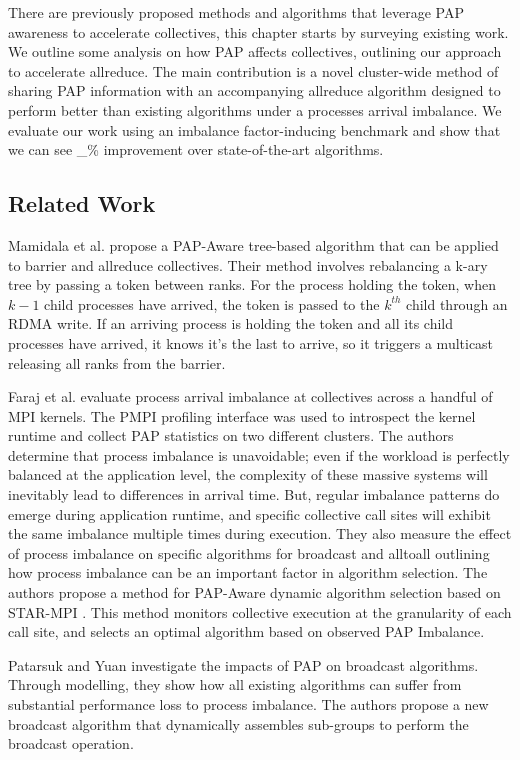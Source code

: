 There are previously proposed methods and algorithms that leverage PAP awareness to accelerate collectives, this chapter starts by surveying existing work.
We outline some analysis on how PAP affects collectives, outlining our approach to accelerate allreduce.
The main contribution is a novel cluster-wide method of sharing PAP information with an accompanying allreduce algorithm designed to perform better than existing algorithms under a processes arrival imbalance.
We evaluate our work using an imbalance factor-inducing benchmark and show that we can see \_\% improvement over state-of-the-art algorithms.  


\subsection{Related Work}
Mamidala et al. \cite{Mamidala2004BarrierAllreduceIBAdaptive} propose a PAP-Aware tree-based algorithm that can be applied to barrier and allreduce collectives.
Their method involves rebalancing a k-ary tree by passing a token between ranks.
For the process holding the token, when $k-1$ child processes have arrived, the token is passed to the $k^{th}$ child through an RDMA write.
If an arriving process is holding the token and all its child processes have arrived, it knows it's the last to arrive, so it triggers a multicast releasing all ranks from the barrier. 

Faraj et al. \cite{Faraj2008StudyProcArrivalMPIColl} evaluate process arrival imbalance at collectives across a handful of MPI kernels.
The PMPI profiling interface was used to introspect the kernel runtime and collect PAP statistics on two different clusters.
The authors determine that process imbalance is unavoidable; even if the workload is perfectly balanced at the application level, the complexity of these massive systems will inevitably lead to differences in arrival time. 
But, regular imbalance patterns do emerge during application runtime, and specific collective call sites will exhibit the same imbalance multiple times during execution.
They also measure the effect of process imbalance on specific algorithms for broadcast and alltoall outlining how process imbalance can be an important factor in algorithm selection.
The authors propose a method for PAP-Aware dynamic algorithm selection based on STAR-MPI \cite{Faraj2006StarMPI}.
This method monitors collective execution at the granularity of each call site, and selects an optimal algorithm based on observed PAP Imbalance. 

Patarsuk and Yuan \cite{Patarasuk2008EffBcastDifProcArr} investigate the impacts of PAP on broadcast algorithms.
Through modelling, they show how all existing algorithms can suffer from substantial performance loss to process imbalance. 
The authors propose a new broadcast algorithm that dynamically assembles sub-groups to perform the broadcast operation.

